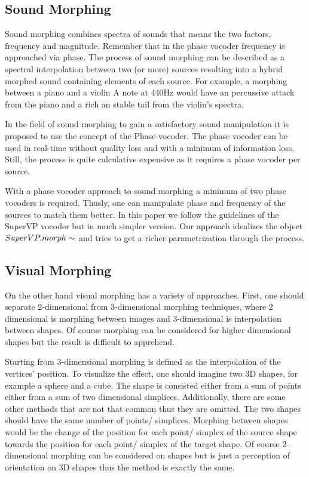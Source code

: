     \subsection{Sound Morphing}

Sound morphing combines spectra of sounds that means the two factors, frequency and magnitude. Remember that in the phase vocoder frequency is approached via phase. The process of sound morphing can be described as a spectral interpolation between two (or more) sources resulting into a hybrid morphed sound containing elements of each source. For example, a morphing between a piano and a violin A note at 440Hz would have an percussive attack from the piano and a rich an stable tail from the violin's spectra. 

In the field of sound morphing to gain a satisfactory sound manipulation it is proposed to use the concept of the Phase vocoder. The phase vocoder can be used in real-time without quality loss and with a minimum of information loss. Still, the process is quite calculative expensive as it requires a phase vocoder per source. 

With a phase vocoder approach to sound morphing a minimum of two phase vocoders is required. Thusly, one can manipulate phase and frequency of the sources to match them better. In this paper we follow the guidelines of the SuperVP vocoder but in much simpler version. Our approach idealizes the object $SuperVP.morph\thicksim$ and tries to get a richer parametrization through the process. 
       

    \subsection{Visual Morphing}
    
On the other hand visual morphing has a variety of approaches. First, one should separate 2-dimensional from 3-dimensional morphing techniques, where 2 dimensional is morphing between images and 3-dimensional is interpolation between shapes. Of course morphing can be considered for higher dimensional shapes but the result is difficult to apprehend.

Starting from 3-dimensional morphing is defined as the interpolation of the vertices' position. To visualize the effect, one should imagine two 3D shapes, for example a sphere and a cube. The shape is consisted either from a sum of points either from a sum of two dimensional simplices. Additionally, there are some other methods that are not that common thus they are omitted. The two shapes should have the same number of points/ simplices. Morphing between shapes would be the change of the position for each point/ simplex of the source shape towards the position for each point/ simplex of the target shape.  Of course 2-dimensional morphing can be considered on shapes but is just a perception of orientation on 3D shapes thus the method is exactly the same.

